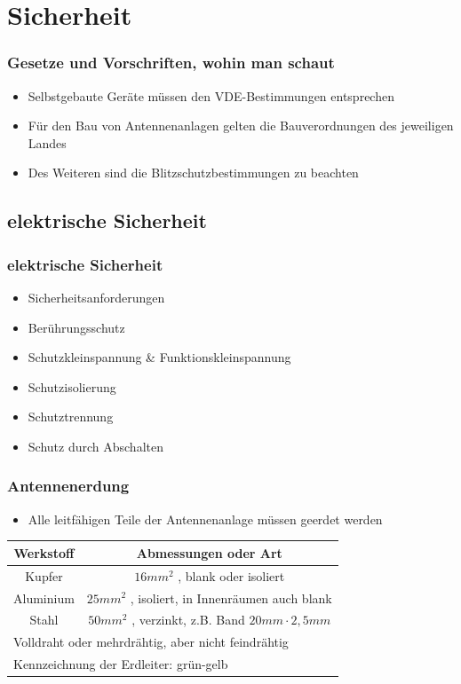 \section{Sicherheit}

\begin{frame}
	\frametitle{Gesetze und Vorschriften, wohin man schaut}
	\begin{itemize}
		\item Selbstgebaute Geräte müssen den VDE-Bestimmungen entsprechen
		\item Für den Bau von Antennenanlagen gelten die Bauverordnungen des jeweiligen Landes
		\item Des Weiteren sind die Blitzschutzbestimmungen zu beachten
	\end{itemize}
\end{frame}

\subsection{elektrische Sicherheit}

\begin{frame}
	\frametitle{elektrische Sicherheit}
	\begin{itemize}
		\item	Sicherheitsanforderungen
		\item	Berührungsschutz
		\item	Schutzkleinspannung \& Funktionskleinspannung
		\item	Schutzisolierung
		\item	Schutztrennung
		\item	Schutz durch Abschalten
	\end{itemize}
\end{frame}

\begin{frame}
	\frametitle{Antennenerdung}
	\begin{itemize}
		\item	Alle leitfähigen Teile der Antennenanlage müssen geerdet werden
	\end{itemize}
	\begin{tabular}{|c|c|}
		\hline
		Werkstoff & Abmessungen oder Art \\ \hline
		Kupfer & $16 mm^2$ , blank oder isoliert \\ \hline
		Aluminium & $25 mm^2$ , isoliert, in Innenräumen auch blank \\ \hline
		Stahl & $50 mm^2$ , verzinkt, z.B. Band $20mm \cdot 2,5mm$ \\ \hline
		\multicolumn{2}{|l|}{Volldraht oder mehrdrähtig, aber nicht feindrähtig} \\
		\multicolumn{2}{|l|}{Kennzeichnung der Erdleiter: grün-gelb} \\ \hline 	
	\end{tabular}
\end{frame}

